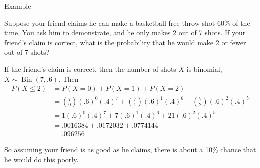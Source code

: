 \documentclass[xcolor=table]{beamer}
\DeclareMathOperator{\Bin}{Bin}
\begin{document}
\begin{frame}{Example}
\begin{block}{}
Suppose your friend claims he can make a basketball free throw shot 60\% of the time. You ask him to demonstrate, and he only makes 2 out of 7 shots. If your friend's claim is correct, what is the probability that he would make 2 or fewer out of 7 shots? 
\end{block}
\pause If the friend's claim is correct, then the number of shots $X$ is binomial, $X\sim\Bin(7, .6)$. \pause Then
\begin{align*}
P(X\leq 2) &= P(X=0)+P(X=1)+P(X=2) \\
&= \binom70(.6)^0(.4)^7 + \binom71(.6)^1(.4)^6+\binom72(.6)^2(.4)^5 \\
&=1(.6)^0(.4)^7 + 7(.6)^1(.4)^6+21(.6)^2(.4)^5 \\
&= .0016384 + .0172032 + .0774144\\
&= .096256
\end{align*}

\pause So assuming your friend is as good as he claims, there is about a 10\% chance that he would do this poorly.
\end{frame}
\end{document}
